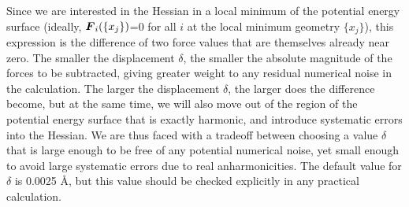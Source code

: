 Since we are interested in the Hessian in a local minimum of the potential
energy surface (ideally, $\mbox{\boldmath$F$}_i(\{x_j\})$=0 for all $i$ at the
local minimum geometry $\{x_j\}$), this expression is the difference
of two force values that are themselves already near zero. The smaller
the displacement $\delta$, the smaller the absolute magnitude of the
forces to be subtracted, giving greater weight to any residual
numerical noise in the calculation. The larger the displacement
$\delta$, the larger does the difference become, but at the same time,
we will also move out of the region of the potential energy surface
that is exactly harmonic, and introduce systematic errors into the
Hessian. We are thus faced with a tradeoff between choosing a value
$\delta$ that is large enough to be free of any potential numerical
noise, yet small enough to avoid large systematic errors due to real
anharmonicities. The default value for $\delta$ is 0.0025 {\AA}, but
this value should be checked explicitly in any practical calculation.
 
